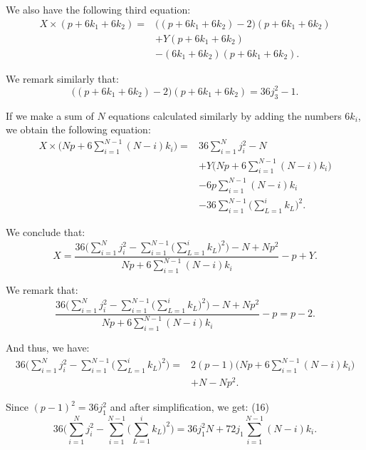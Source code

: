 \documentclass[11pt]{article}
\begin{document}
We also have the following third equation:
\begin{equation}
\begin{aligned}
X\times(p+6k_1+6k_2) = {}& \big((p+6k_1+6k_2)-2\big)(p+6k_1+6k_2) \\
& + Y(p+6k_1+6k_2) \\
& - (6k_1+6k_2)(p+6k_1+6k_2).
\end{aligned}
\end{equation}

We remark similarly that:
\begin{equation}
\big((p+6k_1+6k_2)-2\big)(p+6k_1+6k_2) = 36 j_3^2 - 1.
\end{equation}

If we make a sum of $N$ equations calculated similarly by adding the numbers $6k_i$, we obtain the following equation:
\begin{equation}
\begin{aligned}
X\times\Big(Np + 6\sum_{i=1}^{N-1}(N-i)k_i\Big) = {}& 36\sum_{i=1}^{N} j_i^2 - N \\
& + Y\Big(Np + 6\sum_{i=1}^{N-1}(N-i)k_i\Big) \\
& - 6p\sum_{i=1}^{N-1}(N-i)k_i \\
& - 36\sum_{i=1}^{N-1}\Big(\sum_{L=1}^{i} k_L\Big)^2 .
\end{aligned}
\end{equation}

We conclude that:
\begin{equation}
X = \frac{36\Big(\sum_{i=1}^{N} j_i^2 - \sum_{i=1}^{N-1}\big(\sum_{L=1}^{i}k_L\big)^2\Big) - N + Np^2}{Np + 6\sum_{i=1}^{N-1}(N-i)k_i} - p + Y.
\end{equation}

We remark that:
\begin{equation}
\frac{36\Big(\sum_{i=1}^{N} j_i^2 - \sum_{i=1}^{N-1}\big(\sum_{L=1}^{i}k_L\big)^2\Big) - N + Np^2}{Np + 6\sum_{i=1}^{N-1}(N-i)k_i} - p = p-2.
\end{equation}

And thus, we have:
\begin{equation}
\begin{aligned}36\Big(\sum_{i=1}^{N} j_i^2 - \sum_{i=1}^{N-1}\big(\sum_{L=1}^{i}k_L\big)^2\Big) = {}& 2(p-1)\Big(Np + 6\sum_{i=1}^{N-1}(N-i)k_i\Big)\\ & + N - Np^2.\end{aligned}
\end{equation}

Since $(p-1)^2 = 36 j_1^2$ and after simplification, we get: \hfill (16)
\begin{equation}
36\Big(\sum_{i=1}^{N} j_i^2 - \sum_{i=1}^{N-1}\big(\sum_{L=1}^{i}k_L\big)^2\Big) = 36 j_1^2 N + 72 j_1 \sum_{i=1}^{N-1}(N-i)k_i.
\end{equation}
\end{document}
